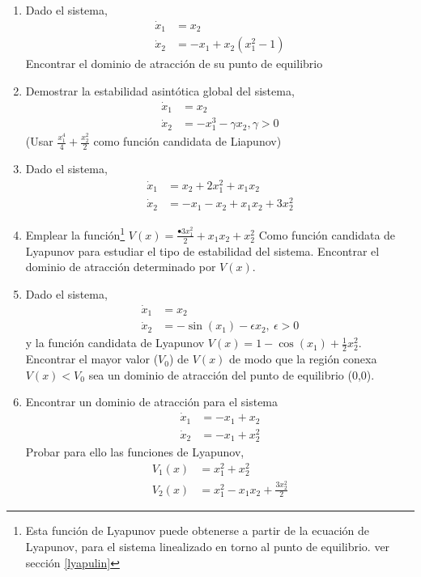 \begin{enumerate}
\item Dado el sistema,
\begin{align*}
\dot x_1 &= x_2\\
\dot x_2 &= -x_1+x_2(x_1^2-1)
\end{align*}
Encontrar el dominio de atracción de su punto de equilibrio
\item Demostrar la estabilidad asintótica global del sistema,
\begin{align*}
\dot x_1 &= x_2\\
\dot x_2 &= -x_1^3 - \gamma x_2, \gamma > 0
\end{align*}
(Usar $\frac{x_1^4}{4}+\frac{x_2^2}{2}$ como función candidata de Liapunov)

\item Dado el sistema,
\begin{align*}
\dot x_1 &= x_2 + 2x_1^2 +x_1x_2\\
\dot x_2 &= -x_1-x_2+x_1x_2+3x_2^2
\end{align*}
\item Emplear la función\footnote{Esta función de Lyapunov puede obtenerse a partir de la ecuación de Lyapunov, para el sistema linealizado en torno al punto de equilibrio. ver sección \ref{lyapulin}}  $V(x) = \frac{•3x_1^2}{2}+x_1x_2+x_2^2$ Como función candidata de Lyapunov para estudiar el tipo de estabilidad  del sistema. Encontrar el dominio de atracción determinado por  $V(x)$.

\item Dado el sistema,
\begin{align*}
\dot x_1 &= x_2\\
\dot x_2 &= -\sin(x_1)-\epsilon x_2,\ \epsilon > 0
\end{align*}
y la función candidata de Lyapunov $V(x) = 1 - \cos(x_1)+\frac{1}{2} x_2^2$. Encontrar el mayor valor ($V_0$) de $V(x)$ de modo que la región conexa $V(x)<V_0$ sea un dominio de atracción del punto de equilibrio (0,0). 

\item  Encontrar un dominio de atracción para el sistema
\begin{align*}
\dot x_1 &= -x_1+x_2\\
\dot x_2 &= -x_1+x_2^2
\end{align*}
Probar para ello las funciones de Lyapunov,
\begin{align*}
V_1(x) &= x_1^2+x_2^2\\
V_2(x) &= x_1^2-x_1x_2+\frac{3x_2^2}{2}
\end{align*}


\end{enumerate}
